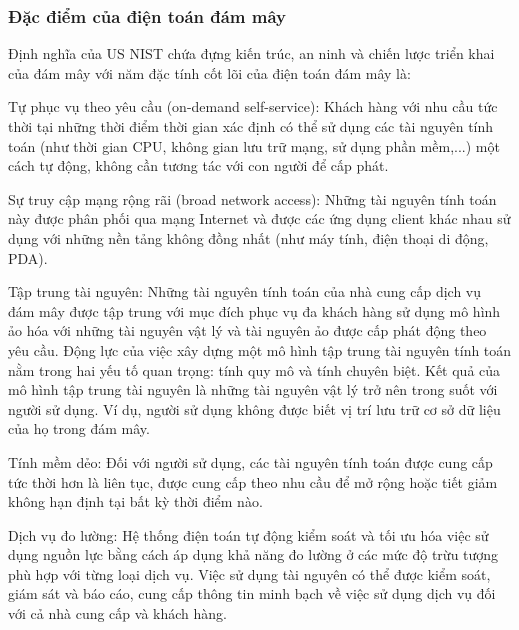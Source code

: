 \subsubsection{Đặc điểm của điện toán đám mây}
Định nghĩa của US NIST chứa đựng kiến trúc, an ninh và chiến lược triển khai của đám mây với năm đặc tính cốt lõi của điện toán đám mây là:

\begin{myitem}
\item Tự phục vụ theo yêu cầu (on-demand self-service): Khách hàng với nhu cầu tức thời tại những thời điểm thời gian xác định có thể sử dụng các tài nguyên tính toán (như thời gian CPU, không gian lưu trữ mạng, sử dụng phần mềm,...) một cách tự động, không cần tương tác với con người để cấp phát.

\item Sự truy cập mạng rộng rãi (broad network access): Những tài nguyên tính toán này được phân phối qua mạng Internet và được các ứng dụng client khác nhau sử dụng với những nền tảng không đồng nhất (như máy tính, điện thoại di động, PDA).

\item Tập trung tài nguyên: Những tài nguyên tính toán của nhà cung cấp dịch vụ đám mây được tập trung với mục đích phục vụ đa khách hàng sử dụng mô hình ảo hóa với những tài nguyên vật lý và tài nguyên ảo được cấp phát động theo yêu cầu. Động lực của việc xây dựng một mô hình tập trung tài nguyên tính toán nằm trong hai yếu tố quan trọng: tính quy mô và tính chuyên biệt. Kết quả của mô hình tập trung tài nguyên là những tài nguyên vật lý trở nên trong suốt với người sử dụng. Ví dụ, người sử dụng không được biết vị trí lưu trữ cơ sở dữ liệu của họ trong đám mây.

\item Tính mềm dẻo: Đối với người sử dụng, các tài nguyên tính toán được cung cấp tức thời hơn là liên tục, được cung cấp theo nhu cầu để mở rộng hoặc tiết giảm không hạn định tại bất kỳ thời điểm nào.

\item Dịch vụ đo lường: Hệ thống điện toán tự động kiểm soát và tối ưu hóa việc sử dụng nguồn lực bằng cách áp dụng khả năng đo lường ở các mức độ trừu tượng phù hợp với từng loại dịch vụ. Việc sử dụng tài nguyên có thể được kiểm soát, giám sát và báo cáo, cung cấp thông tin minh bạch về việc sử dụng dịch vụ đối với cả nhà cung cấp và khách hàng.
\end{myitem}

